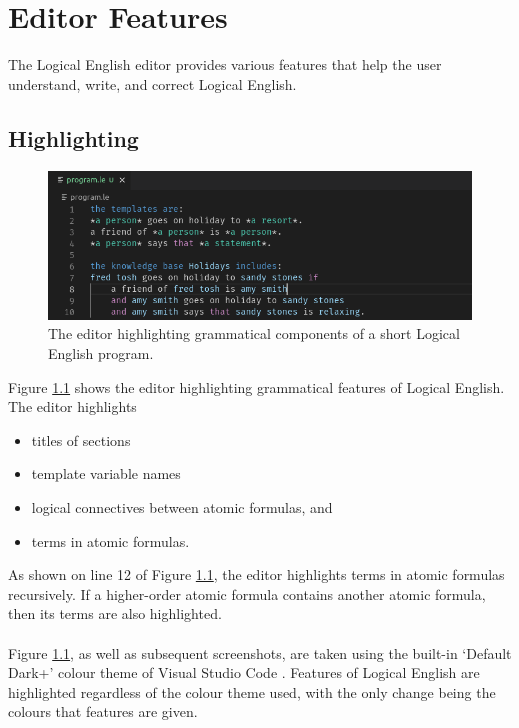 \documentclass[../main.tex]{subfiles}
\begin{document}
\chapter{Editor Features}
\label{chapter:editor-featres}
The Logical English editor provides various features that help the user understand, write, and correct Logical English. 
\section{Highlighting}
\begin{figure}[h!]
\centering
\includegraphics[width = \linewidth]{./figures/highlighting.png}
\caption{The editor highlighting grammatical components of a short Logical English program.}
\label{fig:highlighting}
\end{figure}
Figure \ref{fig:highlighting} shows the editor highlighting grammatical features of Logical English. The editor highlights 
\begin{itemize}
    \item titles of sections
    \item template variable names
    \item logical connectives between atomic formulas, and
    \item terms in atomic formulas.
\end{itemize}
As shown on line 12 of Figure \ref{fig:highlighting}, the editor highlights terms in atomic formulas recursively. If a higher-order atomic formula contains another atomic formula, then its terms are also highlighted.
\\
\\
Figure \ref{fig:highlighting}, as well as subsequent screenshots, are taken using the built-in `Default Dark+' colour theme of Visual Studio Code . Features of Logical English are highlighted regardless of the colour theme used, with the only change being the colours that features are given.
\end{document}
